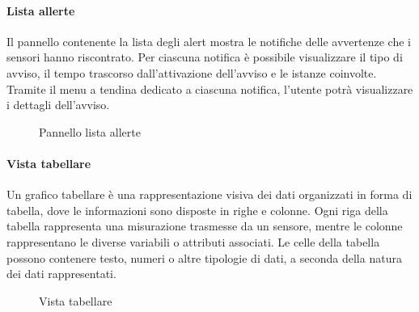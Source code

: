\paragraph{Lista allerte}
Il pannello contenente la lista degli alert mostra le notifiche delle avvertenze che i sensori hanno riscontrato. Per ciascuna notifica è possibile visualizzare il tipo di avviso, il tempo trascorso dall'attivazione dell'avviso e le istanze coinvolte.\\
Tramite il menu a tendina dedicato a ciascuna notifica, l'utente potrà visualizzare i dettagli dell'avviso.
\begin{figure}[H]
    \centering
    \caption{Pannello lista allerte}
    \label{fig:my_label}
\end{figure}

\paragraph{Vista tabellare}
\hypertarget{par:tabella}{}
Un grafico tabellare è una rappresentazione visiva dei dati organizzati in forma di tabella, dove le informazioni sono disposte in righe e colonne. Ogni riga della tabella rappresenta una misurazione trasmesse da un sensore, mentre le colonne rappresentano le diverse variabili o attributi associati. Le celle della tabella possono contenere testo, numeri o altre tipologie di dati, a seconda della natura dei dati rappresentati.
\begin{figure}[H]
    \centering
    \caption{Vista tabellare}
    \label{fig:my_label}
\end{figure}

